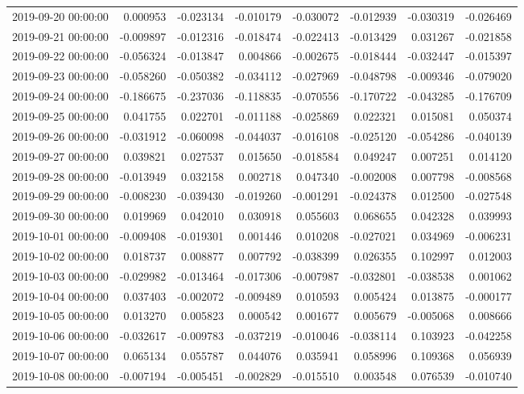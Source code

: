 \begin{tabular}{lrrrrrrr}
2019-09-20 00:00:00 & 0.000953 & -0.023134 & -0.010179 & -0.030072 & -0.012939 & -0.030319 & -0.026469 \\
2019-09-21 00:00:00 & -0.009897 & -0.012316 & -0.018474 & -0.022413 & -0.013429 & 0.031267 & -0.021858 \\
2019-09-22 00:00:00 & -0.056324 & -0.013847 & 0.004866 & -0.002675 & -0.018444 & -0.032447 & -0.015397 \\
2019-09-23 00:00:00 & -0.058260 & -0.050382 & -0.034112 & -0.027969 & -0.048798 & -0.009346 & -0.079020 \\
2019-09-24 00:00:00 & -0.186675 & -0.237036 & -0.118835 & -0.070556 & -0.170722 & -0.043285 & -0.176709 \\
2019-09-25 00:00:00 & 0.041755 & 0.022701 & -0.011188 & -0.025869 & 0.022321 & 0.015081 & 0.050374 \\
2019-09-26 00:00:00 & -0.031912 & -0.060098 & -0.044037 & -0.016108 & -0.025120 & -0.054286 & -0.040139 \\
2019-09-27 00:00:00 & 0.039821 & 0.027537 & 0.015650 & -0.018584 & 0.049247 & 0.007251 & 0.014120 \\
2019-09-28 00:00:00 & -0.013949 & 0.032158 & 0.002718 & 0.047340 & -0.002008 & 0.007798 & -0.008568 \\
2019-09-29 00:00:00 & -0.008230 & -0.039430 & -0.019260 & -0.001291 & -0.024378 & 0.012500 & -0.027548 \\
2019-09-30 00:00:00 & 0.019969 & 0.042010 & 0.030918 & 0.055603 & 0.068655 & 0.042328 & 0.039993 \\
2019-10-01 00:00:00 & -0.009408 & -0.019301 & 0.001446 & 0.010208 & -0.027021 & 0.034969 & -0.006231 \\
2019-10-02 00:00:00 & 0.018737 & 0.008877 & 0.007792 & -0.038399 & 0.026355 & 0.102997 & 0.012003 \\
2019-10-03 00:00:00 & -0.029982 & -0.013464 & -0.017306 & -0.007987 & -0.032801 & -0.038538 & 0.001062 \\
2019-10-04 00:00:00 & 0.037403 & -0.002072 & -0.009489 & 0.010593 & 0.005424 & 0.013875 & -0.000177 \\
2019-10-05 00:00:00 & 0.013270 & 0.005823 & 0.000542 & 0.001677 & 0.005679 & -0.005068 & 0.008666 \\
2019-10-06 00:00:00 & -0.032617 & -0.009783 & -0.037219 & -0.010046 & -0.038114 & 0.103923 & -0.042258 \\
2019-10-07 00:00:00 & 0.065134 & 0.055787 & 0.044076 & 0.035941 & 0.058996 & 0.109368 & 0.056939 \\
2019-10-08 00:00:00 & -0.007194 & -0.005451 & -0.002829 & -0.015510 & 0.003548 & 0.076539 & -0.010740 \\

\end{tabular}
